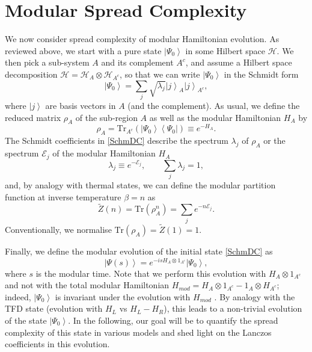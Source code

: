 \documentclass[aps,prl,twocolumn,showpacs,preprintnumbers,amsmath,amssymb]{revtex4-1}
\def\be{\begin{equation}}
\def\ee{\end{equation}}
\newcommand{\ket}[1]{\left| #1 \right>}
\begin{document}
\section*{Modular Spread Complexity}
We now consider spread complexity of modular Hamiltonian evolution. As reviewed above, we start with a pure state $\left|\Psi_0\right>$ in some Hilbert space $\mathcal{H}$. We then pick a sub-system $A$ and its complement $A^c$, and assume a Hilbert space decomposition $\mathcal{H}= \mathcal{H}_A\otimes  \mathcal{H}_{A^c}$, so that we can write $\left|\Psi_0\right>$ in the Schmidt form
\begin{equation}
\left|\Psi_0\right>=\sum_{j}\sqrt{\lambda_j}\left|j\right>_A\left|j\right>_{A^c},\label{SchmDC}
\end{equation}
where $\ket{j}$ are basis vectors in $A$ (and the complement). As usual, we define the reduced matrix $\rho_A$ of the sub-region $A$ as well as the modular Hamiltonian $H_A$ by
\begin{equation}
\rho_A=\text{Tr}_{A^c}\left(\left|\Psi_0\right>\left<\Psi_0\right|\right)\equiv e^{-H_A}.
\end{equation}
The Schmidt coefficients in \eqref{SchmDC} describe the spectrum $\lambda_j$ of $\rho_A$ or the spectrum $\mathcal{E}_j$ of the modular Hamiltonian $H_A$ 
\be
\lambda_j\equiv e^{-\mathcal{E}_j},\qquad \sum_j \lambda_j=1,\label{ModSpecLE}
\ee
and, by analogy with thermal states, we can define the modular partition function at inverse temperature $\beta=n$ as
\be
\tilde{Z}(n)=\text{Tr}(\rho^n_A)=\sum_j e^{-n\mathcal{E}_j}.
\ee 
Conventionally, we normalise $\text{Tr}(\rho_A)=\tilde{Z}(1)=1$.

Finally, we define the modular evolution of the initial state \eqref{SchmDC} as
\begin{equation}
\left|\Psi(s)\right>=e^{-is H_A\otimes 1_{A^c}}\left|\Psi_0\right>,
\end{equation}
where $s$ is the modular time. Note that we perform this evolution with $H_A\otimes 1_{A^c}$ and not with the total modular Hamiltonian $H_{mod}=H_A\otimes 1_{A^c}-1_{A}\otimes H_{A^c}$; indeed, $\ket{\Psi_0}$ is invariant under the evolution with $H_{mod}$ \cite{Haag}. By analogy with the TFD state (evolution with $H_L$ vs $H_L-H_R$), this leads to a non-trivial evolution of the state $\ket{\Psi_0}$. In the following, our goal will be to quantify the spread complexity of this state in various models and shed light on the Lanczos coefficients in this evolution.
\end{document}
